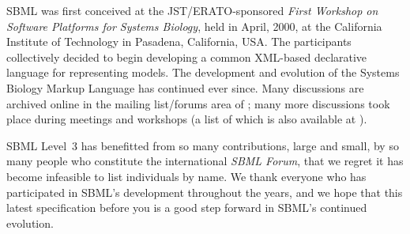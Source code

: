 SBML was first conceived at the JST/ERATO-sponsored \emph{First
  Workshop on Software Platforms for Systems Biology}, held in
April, 2000, at the California Institute of Technology in
Pasadena, California, USA.  The participants collectively decided
to begin developing a common XML-based declarative language for
representing models.  The development and evolution of the Systems
Biology Markup Language has continued ever since.  Many
discussions are archived online in the mailing list/forums area of
; many more
discussions took place during meetings and workshops (a list of
which is also available at
).

SBML Level~3 has benefitted from so many contributions, large and
small, by so many people who constitute the international
\emph{SBML Forum}, that we regret it has become infeasible to list
individuals by name.  We thank everyone who has participated in
SBML's development throughout the years, and we hope that this
latest specification before you is a good step forward in SBML's
continued evolution.

